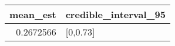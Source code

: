 \begin{longtable}{rl}
\toprule
mean\_est & credible\_interval\_95 \\ 
\midrule
0.2672566 & [0,0.73] \\ 
\bottomrule
\end{longtable}

